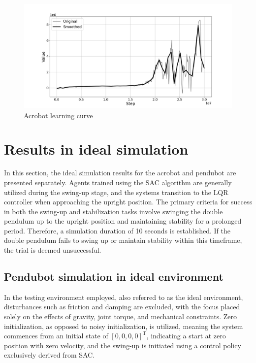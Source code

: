 \begin{figure}[H]
    \centering
    \includegraphics[width=1.1\textwidth]{figures/learning_curve/acrobot_learning_curve_redraw.png} %
    \caption{Acrobot learning curve}
    \label{fig:acrobot_learning_curve_ideal}
\end{figure}

\section{Results in ideal simulation}
In this section, the ideal simulation results for the acrobot and pendubot are presented separately. Agents trained using the SAC algorithm are generally utilized during the swing-up stage, and the systems transition to the LQR controller when approaching the upright position. The primary criteria for success in both the swing-up and stabilization tasks involve swinging the double pendulum up to the upright position and maintaining stability for a prolonged period. Therefore, a simulation duration of 10 seconds is established. If the double pendulum fails to swing up or maintain stability within this timeframe, the trial is deemed unsuccessful.

\subsection{Pendubot simulation in ideal environment}
In the testing environment employed, also referred to as the ideal environment, disturbances such as friction and damping are excluded, with the focus placed solely on the effects of gravity, joint torque, and mechanical constraints. Zero initialization, as opposed to noisy initialization, is utilized, meaning the system commences from an initial state of \([0,0,0,0]^\text{T}\), indicating a start at zero position with zero velocity, and the swing-up is initiated using a control policy exclusively derived from SAC.


